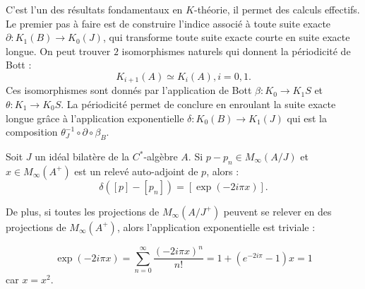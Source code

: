 C'est l'un des résultats fondamentaux en $K$-théorie, il permet des calculs effectifs. Le premier pas à faire est de construire l'indice associé à toute suite exacte $\partial : K_1(B)\rightarrow K_0(J)$, qui transforme toute suite exacte courte en suite exacte longue. On peut trouver $2$ isomorphismes naturels qui donnent la périodicité de Bott :
\[K_{i+1}(A)\simeq K_i(A), i=0,1.\]
Ces isomorphismes sont donnés par l'application de Bott $\beta : K_0 \rightarrow K_1 S$ et $\theta :  K_1 \rightarrow K_0 S$. La périodicité permet de conclure en enroulant la suite exacte longue grâce à l'application exponentielle $\delta : K_0(B)\rightarrow K_1(J)$ qui est la composition $\theta_J^{-1}\circ \partial \circ \beta_B$.\\

\begin{prop} Soit $J$ un idéal bilatère de la $C^*$-algèbre $A$. Si $p-p_n \in M_\infty (A/J)$ et $x\in M_\infty (A^{+})$ est un relevé auto-adjoint de $p$, alors :
\[\delta([p]-[p_n])=[\exp(-2i\pi x)].\]
\label{exp}
\end{prop}
De plus, si toutes les projections de $M_\infty(A/J^{+})$ peuvent se relever en des projections de $M_\infty(A^{+})$, alors l'application exponentielle est triviale :

\[\exp(-2i\pi x )=\sum_{n=0}^\infty \frac{(-2i\pi x)^n}{n!}=1+(e^{-2i\pi}-1) x =1\]
car $x=x^2$.\\

